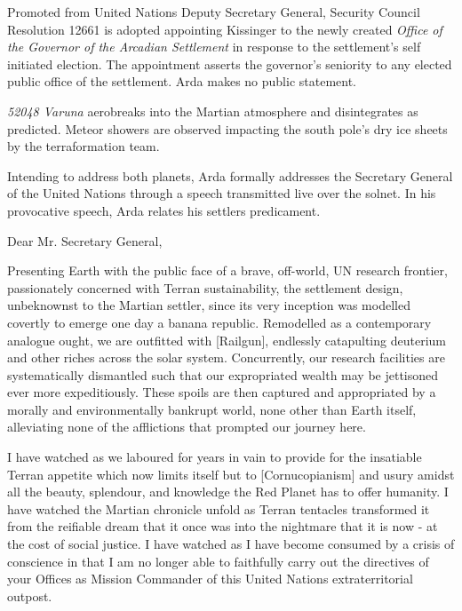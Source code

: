 Promoted from United Nations Deputy Secretary General, Security Council Resolution 12661 is adopted appointing Kissinger to the newly created {\it Office of the Governor of the Arcadian Settlement} in response to the settlement's self initiated election. The appointment asserts the governor's seniority to any elected public office of the settlement. Arda makes no public statement.
\StopTimelineDate

{\it 52048 Varuna} aerobreaks into the Martian atmosphere and disintegrates as predicted. Meteor showers are observed impacting the south pole's dry ice sheets by the terraformation team.
\StopTimelineDate

Intending to address both planets, Arda formally addresses the Secretary General of the United Nations through a speech transmitted live over the solnet. In his provocative speech, Arda relates his settlers predicament.

\startTimelineDocument
Dear Mr. Secretary General,

Presenting Earth with the public face of a brave, off-world, UN research frontier, passionately concerned with Terran sustainability, the settlement design, unbeknownst to the Martian settler, since its very inception was modelled covertly to emerge one day a banana republic. Remodelled as a contemporary analogue ought, we are outfitted with [Railgun], endlessly catapulting deuterium and other riches across the solar system. Concurrently, our research facilities are systematically dismantled such that our expropriated wealth may be jettisoned ever more expeditiously. These spoils are then captured and appropriated by a morally and environmentally bankrupt world, none other than Earth itself, alleviating none of the afflictions that prompted our journey here.

I have watched as we laboured for years in vain to provide for the insatiable Terran appetite which now limits itself but to [Cornucopianism] and usury amidst all the beauty, splendour, and knowledge the Red Planet has to offer humanity. I have watched the Martian chronicle unfold as Terran tentacles transformed it from the reifiable dream that it once was into the nightmare that it is now - at the cost of social justice. I have watched as I have become consumed by a crisis of conscience in that I am no longer able to faithfully carry out the directives of your Offices as Mission Commander of this United Nations extraterritorial outpost.

